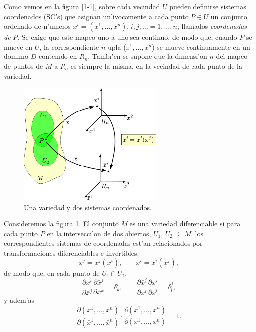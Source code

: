 Como vemos en la figura \ref{1-1}, sobre cada vecindad $U$ pueden definirse sistemas coordenados (SC's) que asignan un'ivocamente a cada punto $P\in U$
un conjunto ordenado de n'umeros $x^i=(x^1,\dots ,x^n)$,
$i,j,\dots =1,\dots ,n$, llamados \textit{coordenadas de} $P$. Se exige que este mapeo uno a
uno sea continuo, de modo que, cuando $P$ se mueve en $U$, la correspondiente $n$-upla
($x^1,\dots ,x^n$) se mueve continuamente en un dominio $D$ contenido en $R_n$. Tambi'en se supone que la dimensi'on $n$ del mapeo de puntos de $M$ a $R_n$ es siempre la misma, en la vecindad de cada punto de la variedad.
\begin{center}
\begin{figure}[H]
\centerline{\includegraphics[height=6cm]{fig/fig-cambio-coordenadas.pdf}}
\caption{Una variedad y dos sistemas coordenados.}
\label{2-1}
\end{figure}
\end{center}

Consideremos la figura \ref{2-1}. El conjunto $M$ es una variedad diferenciable
si para cada punto $P$ en la
intersecci'on de dos abiertos, $U_1$, $U_2$ $\subseteq M$, los
correspondientes sistemas de coordenadas est'an relacionados por transformaciones diferenciables e invertibles: 
\begin{equation}
\bar{x}^j  =\bar{x}^j (x^i ), \qquad x^i  =x^i (\bar{x}^j ),\label{v1}
\end{equation}
de modo que, en cada punto de $U_1\cap U_2$,
\begin{equation}
\frac{\partial x^i }{\partial\bar{x}^j }\frac{\partial\bar{x}^j }{\partial
x^k }=\delta_k ^i, \qquad \frac{\partial\bar{x}^j }{\partial x^i 
}\frac{\partial x^i }{\partial\bar{x}^l }=\delta_l ^j , \label{v2}
\end{equation}
y adem'as
\begin{equation}
\frac{\partial(x^1,\dots ,x^n)}{\partial(\bar{x}^1
,\dots ,\bar{x}^n)}\cdot\frac{\partial(\bar{x}^1,\dots
,\bar{x}^n)}{\partial (x^1,\dots ,x^n)}=1. \label{v3}
\end{equation}

